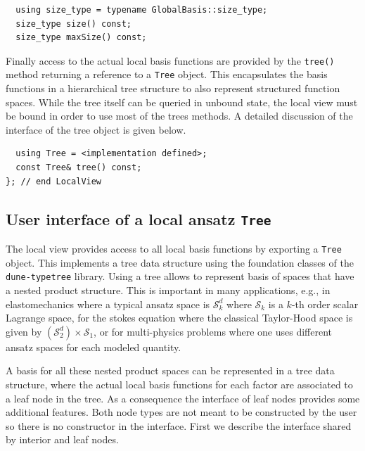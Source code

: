 \documentclass[a4paper,10pt,headings=normal,bibliography=totoc]{scrartcl}
\newcommand{\dunemodule}[1]{\texttt{#1}}
\begin{document}
\begin{lstlisting}
  using size_type = typename GlobalBasis::size_type;
  size_type size() const;
  size_type maxSize() const;
\end{lstlisting}

Finally access to the actual local basis functions are provided
by the \texttt{tree()} method returning a reference to a
\texttt{Tree} object. This encapsulates the basis functions
in a hierarchical tree structure to also represent structured
function spaces.
While the tree  itself can be queried in unbound state,
the local view must be bound in order to use most of the
trees methods.
A detailed discussion of the interface of the tree object is
given below.

\begin{lstlisting}
  using Tree = <implementation defined>;
  const Tree& tree() const;
}; // end LocalView
\end{lstlisting}

\subsection{User interface of a local ansatz \texttt{Tree}}
The local view provides access to all local basis functions
by exporting a \texttt{Tree} object. This implements a tree
data structure using the foundation classes of the
\dunemodule{dune-typetree} library. Using a tree allows
to represent basis of spaces that have a nested product
structure. This is important in many applications, e.g.,
in elastomechanics where a typical ansatz space is $\mathcal{S}_k^d$
where $\mathcal{S}_k$ is a $k$-th order scalar Lagrange space,
for the stokes equation where the classical Taylor-Hood
space is given by $(\mathcal{S}_{2}^d) \times \mathcal{S}_1$,
or for multi-physics problems where one uses different
ansatz spaces for each modeled quantity.

A basis for all these nested product spaces can be represented
in a tree data structure, where the actual local basis
functions for each factor are associated to a leaf node
in the tree. As a consequence the interface of leaf nodes
provides some additional features.
Both node types are not meant to be constructed by the
user so there is no constructor in the interface.
First we describe the interface shared by interior
and leaf nodes.
\end{document}

